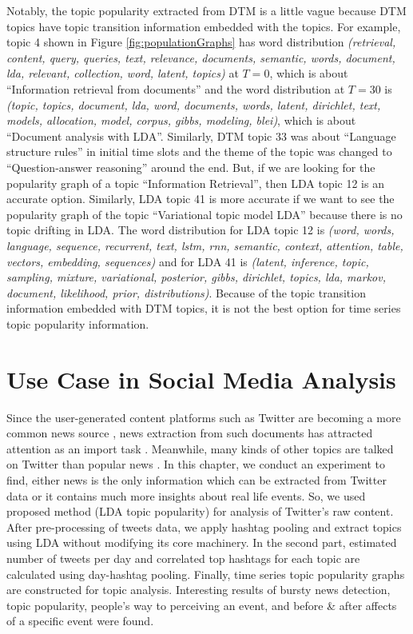 \documentclass[a4paper]{report}
\begin{document}
Notably, the topic popularity extracted from DTM is a little vague because DTM topics have topic transition information embedded with the topics. For example, topic 4 shown in Figure \ref{fig:populationGraphs} has word distribution \textit{(retrieval, content, query, queries, text, relevance, documents, semantic, words, document, lda, relevant, collection, word, latent, topics)} at $T= 0$, which is about ``Information retrieval from documents'' and the word distribution at $T= 30$ is \textit{(topic, topics, document, lda, word, documents, words, latent, dirichlet, text, models, allocation, model, corpus, gibbs, modeling, blei)}, which is about ``Document analysis with LDA''. Similarly, DTM topic 33 was about ``Language structure rules'' in initial time slots and the theme of the topic was changed to ``Question-answer reasoning'' around the end. But, if we are looking for the popularity graph of a topic ``Information Retrieval'', then LDA topic 12 is an accurate option. Similarly, LDA topic 41 is more accurate if we want to see the popularity graph of the topic ``Variational topic model LDA'' because there is no topic drifting in LDA. The word distribution for LDA topic 12 is \textit{(word, words, language, sequence, recurrent, text, lstm, rnn, semantic, context, attention, table, vectors, embedding, sequences)} and for LDA 41 is \textit{(latent, inference, topic, sampling, mixture, variational, posterior, gibbs, dirichlet, topics, lda, markov, document, likelihood, prior, distributions)}. Because of the topic transition information embedded with DTM topics, it is not the best option for time series topic popularity information.


\chapter{Use Case in Social Media Analysis}
Since the user-generated content platforms such as Twitter are becoming a more common news source \cite{bruns2012researching}, news extraction from such documents has attracted attention as an import task \cite{hu2012breaking, brems2017personal}.
Meanwhile, many kinds of other topics are talked on Twitter than popular news \cite{zubiaga2015real, lee2011twitter}. 
In this chapter, we conduct an experiment to find, either news is the only information which can be extracted from Twitter data or it contains much more insights about real life events. So, we used proposed  method (LDA topic popularity) for analysis of Twitter’s raw content. After pre-processing of tweets data, we apply hashtag pooling and extract topics using LDA without modifying its core machinery. In the second part, estimated number of tweets per day and correlated top hashtags for each topic are calculated using day-hashtag pooling. Finally, time series topic popularity graphs are constructed for topic analysis. Interesting results of bursty news detection, topic popularity, people’s way to perceiving an event, and before \& after affects of a specific event were found.
\end{document}
